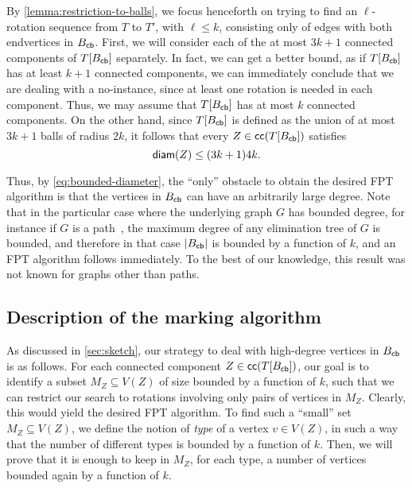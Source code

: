 \documentclass[a4paper,UKenglish,cleveref, autoref, thm-restate]{lipics-v2021}
\newcommand{\diam}{{\sf diam}\xspace}
\newcommand{\Bcb}{B_{\sf cb}\xspace}
\newcommand{\FPT}{{\sf FPT}\xspace}
\begin{document}
By \autoref{lemma:restriction-to-balls}, we focus henceforth on trying to find an $\ell$-rotation sequence from $T$ to $T'$, with $\ell \leq k$, consisting only of edges with both endvertices in $\Bcb$. First, we will consider each of the at most $3k+1$ connected components of $T[\Bcb]$ separately. In fact, we can get a better bound, as if $T[\Bcb]$ has at least $k+1$ connected components, we can immediately conclude that we are dealing with a {\sf no}-instance, since at least one rotation is needed in each component. Thus, we may assume that $T[\Bcb]$ has at most $k$ connected components. On the other hand, since $T[\Bcb]$ is defined as the union of at most $3k+1$ balls of radius $2k$, it follows that every $Z \in {\sf cc}(T[\Bcb])$ satisfies
\begin{equation}\label{eq:bounded-diameter}
\diam(Z) \leq (3k+1)4k.
\end{equation}

Thus, by \autoref{eq:bounded-diameter}, the ``only'' obstacle to obtain the desired \FPT algorithm is that the vertices in $\Bcb$ can have an arbitrarily large degree. Note that in the particular case where the underlying graph $G$ has bounded degree, for instance if $G$ is a path~\cite{cleary2009rotation,kanj2017computing,li20233,lubiw2015flip}, the maximum degree of any elimination tree of $G$ is bounded, and therefore in that case $|\Bcb|$ is bounded by a function of $k$, and  an \FPT algorithm follows immediately. To the best of our knowledge, this result was not known for graphs other than paths.



\subsection{Description of the marking algorithm}
\label{sec:description-marking}

As discussed in \autoref{sec:sketch}, our strategy to deal with high-degree vertices in $\Bcb$ is as follows. For each connected component $Z \in {\sf cc}(T[\Bcb])$, our goal is to identify a subset $M_Z \subseteq V(Z)$ of size bounded by a function of $k$, such that we can restrict our search to rotations involving only pairs of vertices in $M_Z$. Clearly, this would yield the desired \FPT algorithm. To find such a ``small'' set $M_Z \subseteq V(Z)$, we define the notion of \textit{type} of a vertex $v \in V(Z)$, in such a way that the number of different types is bounded by a function of $k$. Then, we will prove that it is enough to keep in $M_Z$, for each type, a number of vertices bounded again by a function of $k$. 
\end{document}
